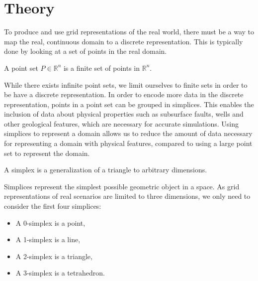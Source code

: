 \section{Theory}
To produce and use grid representations of the real world, there must be a way to map the real, continuous domain to a discrete representation. This is typically done by looking at a set of points in the real domain.

\begin{definition}
A point set $P \in \mathbb{R}^n$ is a finite set of points in $\mathbb{R}^n$.
\end{definition}
While there exists infinite point sets, we limit ourselves to finite sets in order to be have a discrete representation. In order to encode more data in the discrete representation, points in a point set can be grouped in simplices. This enables the inclusion of data about physical properties such as subsurface faults, wells and other geological features, which are necessary for accurate simulations. Using simplices to represent a domain allows us to reduce the amount of data necessary for representing a domain with physical features, compared to using a large point set to represent the domain.


\begin{definition}[Simplex]
A simplex is a generalization of a triangle to arbitrary dimensions.
\end{definition}
Simplices represent the simplest possible geometric object in a space. As grid representations of real scenarios are limited to three dimensions, we only need to consider the first four simplices:
\begin{itemize}
    \item A 0-simplex is a point,
    \item A 1-simplex is a line,
    \item A 2-simplex is a triangle,
    \item A 3-simplex is a tetrahedron.
\end{itemize}

